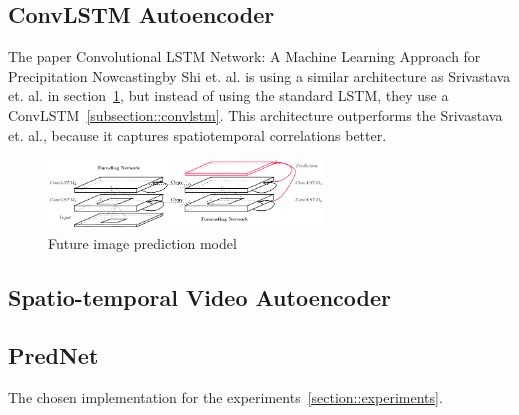  \subsection{ConvLSTM Autoencoder} \label{subsection::convlstm_autoencoder}
  The paper \glqq Convolutional LSTM Network: A Machine Learning Approach for Precipitation Nowcasting\grqq by Shi et. al. \citep{Shi2015} is using a similar architecture as Srivastava et. al. in
  section~\ref{fig:lstm_architecture}, but instead of using the standard LSTM, they use a ConvLSTM~\ref{subsection::convlstm}. This architecture outperforms the Srivastava et. al., because it \glqq 
  captures spatiotemporal correlations better\grqq.
  \begin{figure}[H]
   \includegraphics[width=0.65\textwidth]{../Images/shi.png}
   \centering
   \caption{Future image prediction model \citep{Shi2015}}
   \label{fig:lstm_architecture}
  \end{figure}
 
 \subsection{Spatio-temporal Video Autoencoder}
 
 \subsection{PredNet}
  The chosen implementation for the experiments~\ref{section::experiments}.
